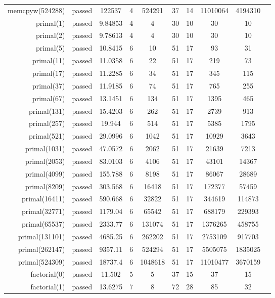 \begin{longtable}{r|ccccccccc}
    memcpyw(524288) & passed & 122537 & 4 & 524291 & 37 & 14 & 11010064 & 4194310 \\
    primal(1) & passed & 9.84853 & 4 & 4 & 30 & 10 & 30 & 10 \\
    primal(2) & passed & 9.78613 & 4 & 4 & 30 & 10 & 30 & 10 \\
    primal(5) & passed & 10.8415 & 6 & 10 & 51 & 17 & 93 & 31 \\
    primal(11) & passed & 11.0358 & 6 & 22 & 51 & 17 & 219 & 73 \\
    primal(17) & passed & 11.2285 & 6 & 34 & 51 & 17 & 345 & 115 \\
    primal(37) & passed & 11.9185 & 6 & 74 & 51 & 17 & 765 & 255 \\
    primal(67) & passed & 13.1451 & 6 & 134 & 51 & 17 & 1395 & 465 \\
    primal(131) & passed & 15.4203 & 6 & 262 & 51 & 17 & 2739 & 913 \\
    primal(257) & passed & 19.944 & 6 & 514 & 51 & 17 & 5385 & 1795 \\
    primal(521) & passed & 29.0996 & 6 & 1042 & 51 & 17 & 10929 & 3643 \\
    primal(1031) & passed & 47.0572 & 6 & 2062 & 51 & 17 & 21639 & 7213 \\
    primal(2053) & passed & 83.0103 & 6 & 4106 & 51 & 17 & 43101 & 14367 \\
    primal(4099) & passed & 155.788 & 6 & 8198 & 51 & 17 & 86067 & 28689 \\
    primal(8209) & passed & 303.568 & 6 & 16418 & 51 & 17 & 172377 & 57459 \\
    primal(16411) & passed & 590.668 & 6 & 32822 & 51 & 17 & 344619 & 114873 \\
    primal(32771) & passed & 1179.04 & 6 & 65542 & 51 & 17 & 688179 & 229393 \\
    primal(65537) & passed & 2333.77 & 6 & 131074 & 51 & 17 & 1376265 & 458755 \\
    primal(131101) & passed & 4685.25 & 6 & 262202 & 51 & 17 & 2753109 & 917703 \\
    primal(262147) & passed & 9357.11 & 6 & 524294 & 51 & 17 & 5505075 & 1835025 \\
    primal(524309) & passed & 18737.4 & 6 & 1048618 & 51 & 17 & 11010477 & 3670159 \\
    factorial(0) & passed & 11.502 & 5 & 5 & 37 & 15 & 37 & 15 \\
    factorial(1) & passed & 13.6275 & 7 & 8 & 72 & 28 & 85 & 32 \\

\end{longtable}
